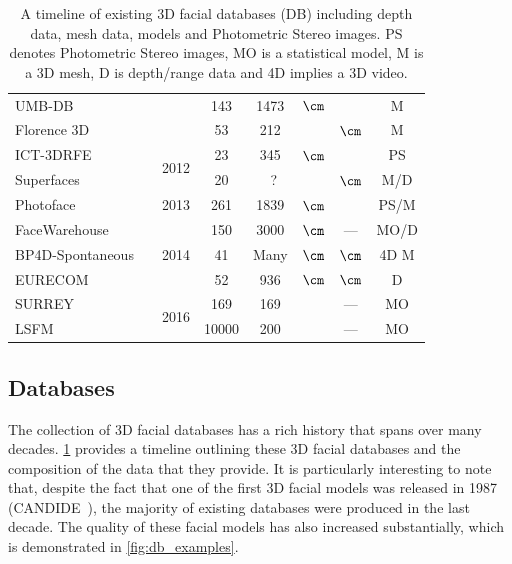 \begin{table}
{\begin{tabular}{@{}lrcccccc@{}}
UMB-DB                      &\cite{colombo2011umb}          &                       & 143         & 1473        & $\cm$       &       & M      \\
Florence 3D                 &\cite{bagdanov2011florence}    &                       & 53          & 212         &             & $\cm$ & M      \\ \midrule
ICT-3DRFE                   &\cite{stratou2012exploring}    & \multirow{2}{*}{2012} & 23          & 345         & $\cm$       &       & PS     \\
Superfaces                  &\cite{berretti2012superfaces}  &                       & 20          &~?           &             & $\cm$ & M/D    \\ \midrule
Photoface                   &\cite{zafeiriou2013photoface}  & 2013                  & 261         & 1839        & $\cm$       &       & PS/M   \\ \midrule
FaceWarehouse               &\cite{Cao:2014gy}              & \multirow{3}{*}{2014} & 150         & 3000        & $\cm$       & ---   & MO/D   \\
BP4D-Spontaneous            &\cite{Zhang:2014id}            &                       & 41          & Many        & $\cm$       & $\cm$ & 4D M   \\
EURECOM                     &\cite{min2014kinectfacedb}     &                       & 52          & 936         & $\cm$       & $\cm$ & D      \\ \midrule
SURREY                      &\cite{Huber:F5Dca9zy}          & \multirow{2}{*}{2016} & 169         & 169         &             & ---   & MO     \\
LSFM                        &\cite{booth2016lsfm}           &                       & 10000       & 200         &             & ---   & MO     \\ \bottomrule
\end{tabular}%
}
\caption{A timeline of existing 3D facial databases (DB) including depth data, mesh
         data, models and Photometric Stereo images. PS denotes Photometric
         Stereo images, MO is a statistical model, M is a 3D mesh,
         D is depth/range data and 4D implies a 3D video.}
\label{tbl:timeline_db}
\end{table}
\subsection{Databases}\label{subsec:bg_databases}
The collection of 3D facial databases has a rich history
that spans over many decades. \cref{tbl:timeline_db} provides a
timeline outlining these 3D facial databases and the composition of the
data that they provide.
It is particularly interesting to note that, despite the fact that one of the
first 3D facial models was released in 1987 (CANDIDE~\cite{Rydfalk:1987tg}), the
majority of existing databases were produced in the last decade. The quality
of these facial models has also increased substantially, which is demonstrated
in \cref{fig:db_examples}.

